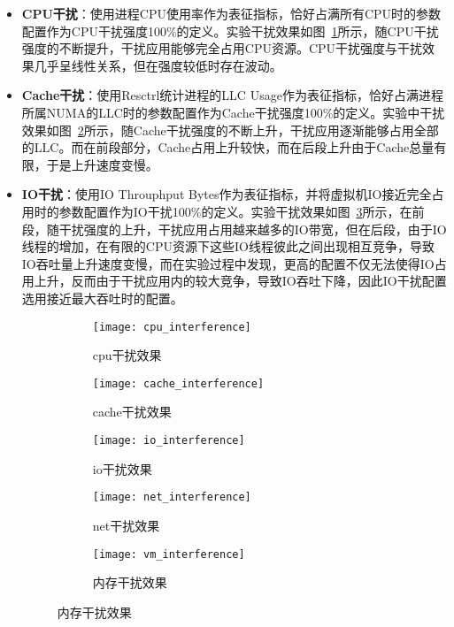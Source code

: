 \begin{itemize}
    \item \textbf{CPU干扰}：使用进程CPU使用率作为表征指标，恰好占满所有CPU时的参数配置作为CPU干扰强度100\%的定义。实验干扰效果如图~\ref{fig:cpu_interference}所示，随CPU干扰强度的不断提升，干扰应用能够完全占用CPU资源。CPU干扰强度与干扰效果几乎呈线性关系，但在强度较低时存在波动。
    
    \item \textbf{Cache干扰}：使用Resctrl统计进程的LLC Usage作为表征指标，恰好占满进程所属NUMA的LLC时的参数配置作为Cache干扰强度100\%的定义。实验中干扰效果如图~\ref{fig:cache_interference}所示，随Cache干扰强度的不断上升，干扰应用逐渐能够占用全部的LLC。而在前段部分，Cache占用上升较快，而在后段上升由于Cache总量有限，于是上升速度变慢。

    \item \textbf{IO干扰}：使用IO Throuphput Bytes作为表征指标，并将虚拟机IO接近完全占用时的参数配置作为IO干扰100\%的定义。实验干扰效果如图~\ref{fig:io_interference}所示，在前段，随干扰强度的上升，干扰应用占用越来越多的IO带宽，但在后段，由于IO线程的增加，在有限的CPU资源下这些IO线程彼此之间出现相互竞争，导致IO吞吐量上升速度变慢，而在实验过程中发现，更高的配置不仅无法使得IO占用上升，反而由于干扰应用内的较大竞争，导致IO吞吐下降，因此IO干扰配置选用接近最大吞吐时的配置。

\begin{figure}[H]
  \centering
  \begin{subfigure}[b]{0.32\textwidth}
    \texttt{[image: cpu\_interference]}
    \caption{cpu干扰效果}
    \label{fig:cpu_interference}
  \end{subfigure}
  \begin{subfigure}[b]{0.32\textwidth}
    \texttt{[image: cache\_interference]}
    \caption{cache干扰效果}
    \label{fig:cache_interference}
  \end{subfigure}
  \begin{subfigure}[b]{0.32\textwidth}
    \texttt{[image: io\_interference]}
    \caption{io干扰效果}
    \label{fig:io_interference}
  \end{subfigure}
  \begin{subfigure}[b]{0.32\textwidth}
    \texttt{[image: net\_interference]}
    \caption{net干扰效果}
    \label{fig:net_interference}
  \end{subfigure}
  \begin{subfigure}[b]{0.32\textwidth}
    \texttt{[image: vm\_interference]}
    \caption{内存干扰效果}
    \label{fig:vm_interference}
  \end{subfigure}
  \label{fig:interference}
\end{figure}


\end{itemize}
